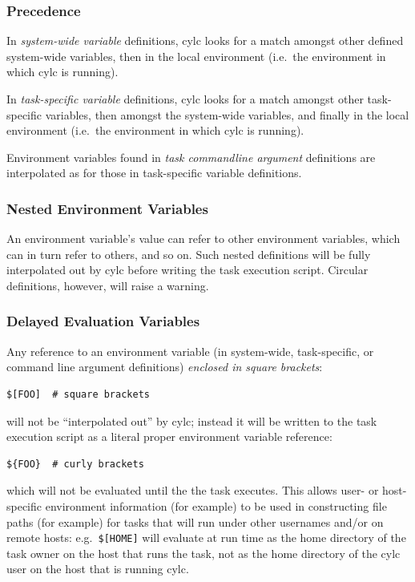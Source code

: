 \documentclass[11pt,a4paper]{article}
\begin{document}
\subsubsection{Precedence}

In {\em system-wide variable} definitions, cylc looks for a match
amongst other defined system-wide variables, then in the local
environment (i.e.\ the environment in which cylc is running).

In {\em task-specific variable} definitions, cylc looks for a match
amongst other task-specific variables, then amongst the system-wide
variables, and finally in the local environment (i.e.\ the environment
in which cylc is running).

Environment variables found in {\em task commandline argument}
definitions are interpolated as for those in task-specific variable
definitions.

\subsubsection{Nested Environment Variables}

An environment variable's value can refer to other environment
variables, which can in turn refer to others, and so on. Such nested
definitions will be fully interpolated out by cylc before writing the 
task execution script.  Circular definitions, however, will raise a
warning.

\subsubsection{Delayed Evaluation Variables}
\label{DelayedEvaluationVariables}

Any reference to an environment variable (in system-wide, task-specific,
or command line argument definitions) {\em enclosed in square brackets}:

\begin{lstlisting}
$[FOO]  # square brackets
\end{lstlisting}

will not be ``interpolated out'' by cylc; instead it will be written to
the task execution script as a literal proper environment variable
reference:

\begin{lstlisting}
${FOO}  # curly brackets
\end{lstlisting}

which will not be evaluated until the the task executes. This allows
user- or host-specific environment information (for example) to
be used in constructing file paths (for example) for tasks that will run
under other usernames and/or on remote hosts: e.g.\ \lstinline=$[HOME]=
will evaluate at run time as the home directory of the task owner on the
host that runs the task, not as the home directory of the cylc user on
the host that is running cylc.
\end{document}
